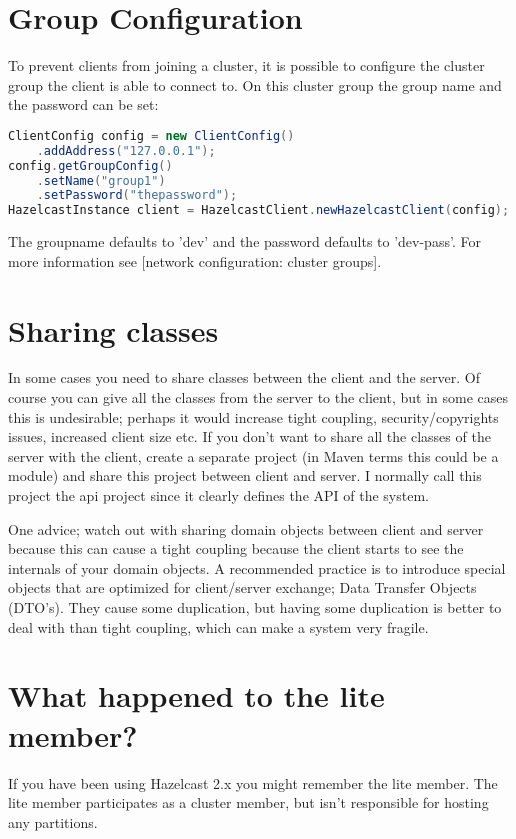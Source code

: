 \section{Group Configuration}
To prevent clients from joining a cluster, it is possible to configure the cluster group the client is able to connect to. On this cluster group the group name and the password can be set:
\begin{lstlisting}[language=java]
ClientConfig config = new ClientConfig()
    .addAddress("127.0.0.1");
config.getGroupConfig()
    .setName("group1")
    .setPassword("thepassword");
HazelcastInstance client = HazelcastClient.newHazelcastClient(config);
\end{lstlisting}
The groupname defaults to 'dev' and the password defaults to 'dev-pass'. For more information see [network configuration: cluster groups].

\section{Sharing classes}
In some cases you need to share classes between the client and the server. Of course you can give all the classes from the server to the client, but in some cases this is undesirable; perhaps it would increase tight coupling, security/copyrights issues, increased client size etc. If you don't want to share all the classes of the server with the client, create a separate project (in Maven terms this could be a module) and share this project between client and server. I normally call this project the api project since it clearly defines the API of the system. 

One advice; watch out with sharing domain objects between client and server because this can cause a tight coupling because the client starts to see the internals of your domain objects. A recommended practice is to introduce special objects that are optimized for client/server exchange; Data Transfer Objects (DTO's). They cause some duplication, but having some duplication is better to deal with than tight coupling, which can make a system very fragile.

\section{What happened to the lite member?}
If you have been using Hazelcast 2.x you might remember the lite member. The lite member participates as a cluster member, but isn't responsible for hosting any partitions. 

